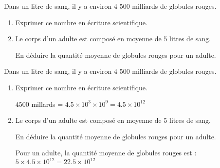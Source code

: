 \begin{exercice*}
    Dans un litre de sang, il y a environ 4 500 milliards de globules rouges.
    \begin{enumerate}
        \item Exprimer ce nombre en écriture scientifique.
        \item Le corps d’un adulte est composé en moyenne de 5 litres de sang.
        
        En déduire la quantité moyenne de globules rouges pour un adulte.
    \end{enumerate}    
\end{exercice*}
\begin{corrige}
    Dans un litre de sang, il y a environ 4 500 milliards de globules rouges.
    \begin{enumerate}
        \item Exprimer ce nombre en écriture scientifique.
        
        {\red $\num{4500}$ millards = $\num{4.5}\times 10^3\times 10^9 = \num{4.5}\times 10^{12}$}
        \item Le corps d’un adulte est composé en moyenne de 5 litres de sang.
        
        En déduire la quantité moyenne de globules rouges pour un adulte.

        {\red Pour un adulte, la quantité moyenne de globules rouges est : $5\times \num{4.5}\times 10^{12} = \num{22.5}\times 10^{12}$}
    \end{enumerate}    
\end{corrige}

